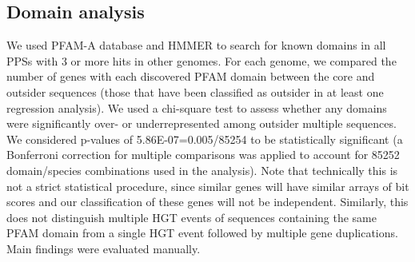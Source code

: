 \subsection{Domain analysis}
\label{domain_analysis}
We used PFAM-A \cite{Finn2014} database and HMMER \cite{Prakash2017} to search
for known domains in all PPSs with 3 or more hits in other genomes.  For each
genome, we compared the number of genes with each discovered PFAM domain
between the core and outsider sequences (those that have been classified as
outsider in at least one regression analysis).  We used a chi-square test to
assess whether any domains were significantly over- or underrepresented among
outsider multiple sequences.  We considered p-values of 5.86E-07=0.005/85254 to
be statistically significant (a Bonferroni correction for multiple comparisons
was applied to account for 85252 domain/species combinations used in the
analysis). Note that technically this is not a strict statistical procedure,
since similar genes will have similar arrays of bit scores and our
classification of these genes will not be independent. Similarly, this does not
distinguish multiple HGT events of sequences containing the same PFAM domain
from a single HGT event followed by multiple gene duplications. Main findings
were evaluated manually.

